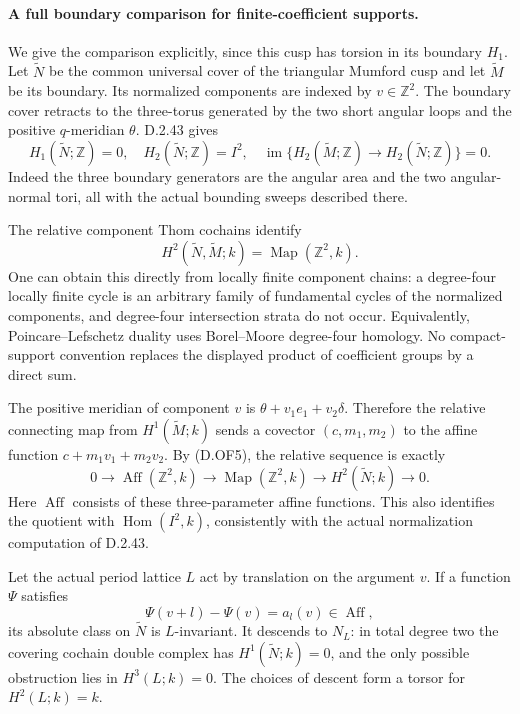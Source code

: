 \paragraph{A full boundary comparison for finite-coefficient supports.}
We give the comparison explicitly, since this cusp has torsion in
its boundary \(H_1\). Let \(\widetilde N\) be the common universal
cover of the triangular Mumford cusp and let
\(\widetilde M\) be its boundary. Its normalized components are
indexed by \(v\in\mathbb Z^2\). The boundary cover retracts to the
three-torus generated by the two short angular loops and the positive
\(q\)-meridian \(\theta\). D.2.43 gives
\[
 H_1(\widetilde N;\mathbb Z)=0,\quad
 H_2(\widetilde N;\mathbb Z)=I^2,\quad
 \operatorname{im}\{H_2(\widetilde M;\mathbb Z)\to
                         H_2(\widetilde N;\mathbb Z)\}=0. \tag{D.OF5}
\]
Indeed the three boundary generators are the
angular area and the two angular-normal tori, all with the actual
bounding sweeps described there.

The relative component Thom cochains identify
\[
 H^2(\widetilde N,\widetilde M;k)
                  =\operatorname{Map}(\mathbb Z^2,k).
\]
One can obtain this directly from locally finite
component chains: a degree-four locally finite cycle is an arbitrary
family of fundamental cycles of the normalized components, and
degree-four intersection strata do not occur. Equivalently,
Poincare--Lefschetz duality uses Borel--Moore degree-four homology.
No compact-support convention replaces the displayed product of
coefficient groups by a direct sum.

The positive meridian of component \(v\) is
\(\theta+v_1e_1+v_2\delta\). Therefore the relative connecting map
from \(H^1(\widetilde M;k)\) sends a covector \((c,m_1,m_2)\) to
the affine function \(c+m_1v_1+m_2v_2\). By (D.OF5), the relative
sequence is exactly
\[
 0\longrightarrow\operatorname{Aff}(\mathbb Z^2,k)
 \longrightarrow\operatorname{Map}(\mathbb Z^2,k)
 \longrightarrow H^2(\widetilde N;k)\longrightarrow0.     \tag{D.OF6}
\]
Here \(\operatorname{Aff}\) consists of these three-parameter
affine functions. This also identifies the quotient with
\(\operatorname{Hom}(I^2,k)\), consistently with the actual
normalization computation of D.2.43.

Let the actual period lattice \(L\) act by translation on the
argument \(v\). If a function \(\Psi\) satisfies
\[
                  \Psi(v+l)-\Psi(v)=a_l(v)
                       \in\operatorname{Aff},           \tag{D.OF7}
\]
its absolute class on \(\widetilde N\) is \(L\)-invariant.
It descends to \(N_L\): in total degree two the covering
cochain double complex has \(H^1(\widetilde N;k)=0\), and
the only possible obstruction lies in \(H^3(L;k)=0\).
The choices of descent form a torsor for \(H^2(L;k)=k\).

